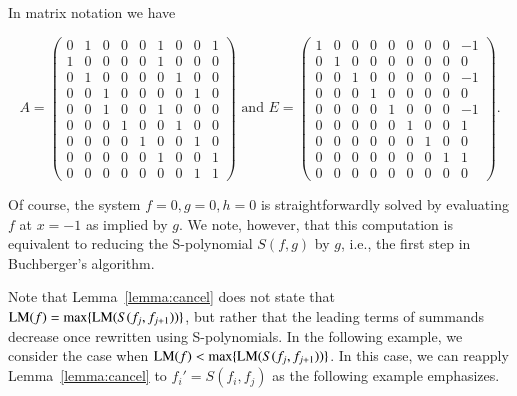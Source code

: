 \begin{example}
In matrix notation we have
\begin{scriptsize}
\[
A = \left(\begin{array}{rrrrrrrrr}
0 & 1 & 0 & 0 & 0 & 1 & 0 & 0 & 1 \\
1 & 0 & 0 & 0 & 0 & 1 & 0 & 0 & 0 \\
0 & 1 & 0 & 0 & 0 & 0 & 1 & 0 & 0 \\
0 & 0 & 1 & 0 & 0 & 0 & 0 & 1 & 0 \\
0 & 0 & 1 & 0 & 0 & 1 & 0 & 0 & 0 \\
0 & 0 & 0 & 1 & 0 & 0 & 1 & 0 & 0 \\
0 & 0 & 0 & 0 & 1 & 0 & 0 & 1 & 0 \\
0 & 0 & 0 & 0 & 0 & 1 & 0 & 0 & 1 \\
0 & 0 & 0 & 0 & 0 & 0 & 0 & 1 & 1
\end{array}\right) \mbox{  and  }
E = \left(\begin{array}{rrrrrrrrr}
1 & 0 & 0 & 0 & 0 & 0 & 0 & 0 & -1 \\
0 & 1 & 0 & 0 & 0 & 0 & 0 & 0 & 0 \\
0 & 0 & 1 & 0 & 0 & 0 & 0 & 0 & -1 \\
0 & 0 & 0 & 1 & 0 & 0 & 0 & 0 & 0 \\
0 & 0 & 0 & 0 & 1 & 0 & 0 & 0 & -1 \\
0 & 0 & 0 & 0 & 0 & 1 & 0 & 0 & 1 \\
0 & 0 & 0 & 0 & 0 & 0 & 1 & 0 & 0 \\
0 & 0 & 0 & 0 & 0 & 0 & 0 & 1 & 1 \\
0 & 0 & 0 & 0 & 0 & 0 & 0 & 0 & 0
\end{array}\right).\]
\end{scriptsize}
Of course, the system $f=0,g=0,h=0$ is straightforwardly solved by evaluating $f$ at $x= -1$ as implied by $g$. We note, however, that this computation is equivalent to reducing the S-polynomial $S(f,g)$ by $g$, i.e., the first step in Buchberger's algorithm.
\end{example}
Note that Lemma~\ref{lemma:cancel} does not state that $\textsc{LM}(f) = \max\{\textsc{LM}(S(f_j,f_{j+1}))\}$, but rather that the leading terms of summands decrease once rewritten using S-polynomials. In the following example, we consider the case when $\textsc{LM}(f) < \max\{\textsc{LM}(S(f_j,f_{j+1}))\}$. In this case, we can reapply Lemma~\ref{lemma:cancel} to $f_i' = S(f_i,f_j)$ as the following example emphasizes.


